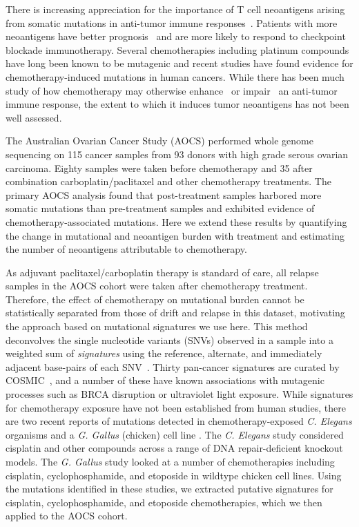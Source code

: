 There is increasing appreciation for the importance of T cell neoantigens arising from somatic mutations in anti-tumor immune responses~\cite{Schumacher_2015}. Patients with more neoantigens have better prognosis~\cite{Brown_2014} and are more likely to respond to checkpoint blockade immunotherapy\cite{Van_Allen_2015,Rizvi_2015}. Several chemotherapies including platinum compounds have long been known to be mutagenic\cite{Hannan_1989} and recent studies have found evidence for chemotherapy-induced mutations in human cancers\cite{Murugaesu_2015,Johnson_2013}. While there has been much study of how chemotherapy may otherwise enhance~\cite{Hato_2012,Machiels2001,Hodge2013} or impair~\cite{Litterman_2013} an anti-tumor immune response, the extent to which it induces tumor neoantigens has not been well assessed.

The Australian Ovarian Cancer Study (AOCS) performed whole genome sequencing on 115 cancer samples from 93 donors with high grade serous ovarian carcinoma\cite{Patch_2015}. Eighty samples were taken before chemotherapy and 35 after combination carboplatin/paclitaxel and other chemotherapy treatments. The primary AOCS analysis found that post-treatment samples harbored more somatic mutations than pre-treatment samples and exhibited evidence of chemotherapy-associated mutations. Here we extend these results by quantifying the change in mutational and neoantigen burden with treatment and estimating the number of neoantigens attributable to chemotherapy.

As adjuvant paclitaxel/carboplatin therapy is standard of care, all relapse samples in the AOCS cohort were taken after chemotherapy treatment. Therefore, the effect of chemotherapy on mutational burden cannot be statistically separated from those of drift and relapse in this dataset, motivating the approach based on mutational signatures we use here. This method deconvolves the single nucleotide variants (SNVs) observed in a sample into a weighted sum of \textit{signatures} using the reference, alternate, and immediately adjacent base-pairs of each SNV~\cite{Alexandrov2013}. Thirty pan-cancer signatures are curated by COSMIC~\cite{364242}, and a number of these have known associations with mutagenic processes such as BRCA disruption or ultraviolet light exposure. While signatures for chemotherapy exposure have not been established from human studies, there are two recent reports of mutations detected in chemotherapy-exposed \textit{C. Elegans} organisms\cite{Meier_2014} and a \textit{G. Gallus} (chicken) cell line \cite{Szikriszt_2016}. The \textit{C. Elegans} study considered cisplatin and other compounds across a range of DNA repair-deficient knockout models. The \textit{G. Gallus} study looked at a number of chemotherapies including cisplatin, cyclophosphamide, and etoposide in wildtype chicken cell lines. Using the mutations identified in these studies, we extracted putative signatures for cisplatin, cyclophosphamide, and etoposide chemotherapies, which we then applied to the AOCS cohort.